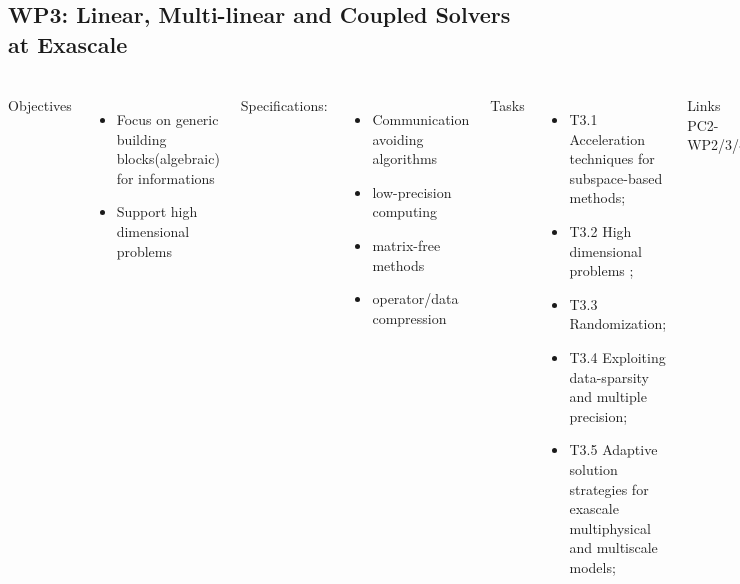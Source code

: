\subsection{WP3: Linear, Multi-linear and Coupled Solvers at Exascale}
\begin{frame}
  \frametitle{\insertsectionhead}
  \framesubtitle{\insertsubsectionhead}
  \footnotesize
  \begin{columns}[t]
    Objectives
    \begin{itemize}
      \item Focus on generic building blocks(algebraic) for informations
      \item Support high dimensional problems
    \end{itemize}
    Specifications: 
    \begin{itemize}
      \item Communication avoiding algorithms
      \item low-precision computing
      \item matrix-free methods
      \item operator/data compression
    \end{itemize}
    Tasks
    \begin{itemize}
      \item T3.1 Acceleration techniques for subspace-based methods;
      \item T3.2 High dimensional problems ;
      \item T3.3 Randomization;
      \item T3.4 Exploiting data-sparsity and multiple precision;
      \item T3.5 Adaptive solution strategies for exascale multiphysical and multiscale models;
    \end{itemize}
    \begin{alertblock}{Links}
    PC2-WP2/3/4 
  \end{alertblock}
  \end{columns}
\end{frame}

